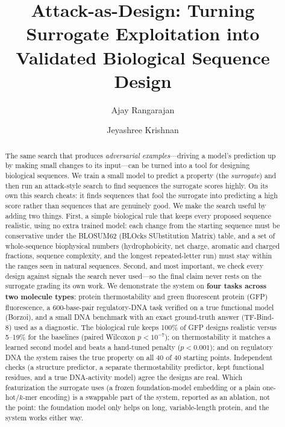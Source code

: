 \documentclass{article}
\title{\textbf{Attack-as-Design: Turning Surrogate Exploitation into
Validated Biological Sequence Design}}
\author{Ajay Rangarajan \and Jeyashree Krishnan}
\date{}
\begin{document}
\maketitle

\begin{abstract}
\noindent
The same search that produces \emph{adversarial examples}---driving a model's prediction up
by making small changes to its input---can be turned into a tool for designing biological
sequences. We train a small model to predict a property (the \emph{surrogate}) and then run
an attack-style search to find sequences the surrogate scores highly. On its own this search
cheats: it finds sequences that fool the surrogate into predicting a high score rather than
sequences that are genuinely good. We make the search useful by adding two things. First, a
simple biological rule that keeps every proposed sequence realistic, using no extra trained
model: each change from the starting sequence must be conservative under the BLOSUM62
(BLOcks SUbstitution Matrix) table, and a set of whole-sequence biophysical numbers
(hydrophobicity, net charge, aromatic and charged fractions, sequence complexity, and the
longest repeated-letter run) must stay within the ranges seen in natural sequences. Second,
and most important, we check every design against signals the search never used---so the
final claim never rests on the surrogate grading its own work. We demonstrate the system on
\textbf{four tasks across two molecule types}: protein thermostability and green fluorescent
protein (GFP) fluorescence, a 600-base-pair regulatory-DNA task verified on a true
functional model (Borzoi), and a small DNA benchmark with an exact ground-truth answer
(TF-Bind-8) used as a diagnostic. The biological rule keeps 100\% of GFP designs realistic
versus 5--19\% for the baselines (paired Wilcoxon $p<10^{-7}$); on thermostability it matches
a learned second model and beats a hand-tuned penalty ($p<0.001$); and on regulatory DNA the
system raises the true property on all 40 of 40 starting points. Independent checks (a
structure predictor, a separate thermostability predictor, kept functional residues, and a
true DNA-activity model) agree the designs are real. Which featurization the surrogate uses
(a frozen foundation-model embedding or a plain one-hot/$k$-mer encoding) is a swappable
part of the system, reported as an ablation, not the point: the foundation model only helps
on long, variable-length protein, and the system works either way.
\end{abstract}
\end{document}

